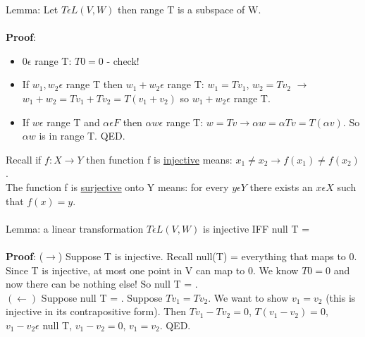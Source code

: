 \documentclass{article}
\begin{document}
Lemma: Let $T\epsilon L(V,W)$ then range T is a subspace of W. \\\\

\textbf{Proof}: 
\begin{itemize}
\item $0 \epsilon $ range T: $T0=0$ - check! 
\item If $w_1, w_2 \epsilon$ range T then $w_1 + w_2 \epsilon$ range T: $w_1 = Tv_1$, $w_2 = Tv_2$ $\rightarrow$ $w_1 + w_2 = Tv_1 + Tv_2 = T(v_1 + v_2)$ so $w_1 + w_2 \epsilon $ range T.
\item If $w \epsilon $ range T and $\alpha \epsilon F$ then $\alpha w \epsilon $ range T: $w = Tv \rightarrow \alpha w = \alpha Tv = T(\alpha v)$. So $\alpha w$ is in range T. QED.
\end{itemize}
Recall if $f: X \rightarrow Y $ then function f is \underline{injective} means: $x_1 \neq x_2 \rightarrow f(x_1) \neq f(x_2)$. \\
The function f is \underline{surjective} onto Y means: for every $y \epsilon Y$ there exists an $x \epsilon X$ such that $f(x) = y$. \\\\
Lemma: a linear transformation $T \epsilon L(V,W)$ is injective IFF null T = \textbraceright \\\\
\textbf{Proof}: ($\rightarrow$) Suppose T is injective. Recall null(T) = everything that maps to 0. Since T is injective, at most one point in V can map to 0. We know $T0 = 0$ and now there can be nothing else! So null T = \textbraceright.\\
$(\leftarrow)$ Suppose null T = \textbraceright. Suppose $Tv_1 = Tv_2$. We want to show $v_1 = v_2$ (this is injective in its contrapositive form). Then $Tv_1 - Tv_2 = 0$, $T(v_1 - v_2) = 0$, $v_1 - v_2 \epsilon $ null T, $v_1 - v_2 = 0$, $v_1 = v_2$. QED. 
\end{document}
